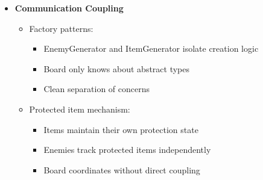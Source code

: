 \documentclass{article}
\begin{document}
\begin{itemize}
    \item \textbf{Communication Coupling}
    \begin{itemize}
        \item Factory patterns:
        \begin{itemize}
            \item EnemyGenerator and ItemGenerator isolate creation logic
            \item Board only knows about abstract types
            \item Clean separation of concerns
        \end{itemize}
        \item Protected item mechanism:
        \begin{itemize}
            \item Items maintain their own protection state
            \item Enemies track protected items independently
            \item Board coordinates without direct coupling
        \end{itemize}
    \end{itemize}
\end{itemize}
\end{document}
